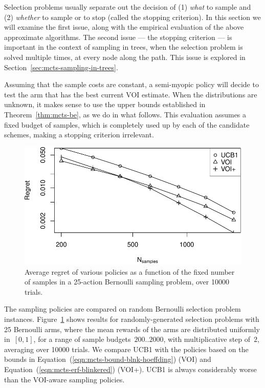 Selection problems usually separate out the decision of (1) {\em what}
to sample and (2) {\em whether} to sample or to stop (called the stopping criterion).
In this section we will examine the first issue, along with the empirical evaluation 
of the above approximate algorithms. The second issue --- the stopping
criterion --- is important in the context of sampling in trees, when the
selection problem is solved multiple times, at every node along the
path. This issue is explored in Section~\ref{sec:mcts-sampling-in-trees}.

Assuming that the sample costs are constant,
a semi-myopic policy will decide to test the arm that has the best
current VOI estimate. 
When the distributions are unknown, it makes sense
to use the upper bounds established in Theorem~\ref{thm:mcts-be}, as
we do in what follows. This evaluation assumes a fixed budget of samples, which is
completely used up by each of the candidate schemes, making a stopping
criterion irrelevant.

\begin{figure}[h!]
\centering
\includegraphics[scale=0.55]{mcts-flat.pdf}
\caption{Average regret of various policies as a function of the fixed number 
of samples in a 25-action Bernoulli sampling problem, over 10000 trials.}
\label{fig:random-instances}
\end{figure}

The sampling policies are compared on random Bernoulli
selection problem instances. Figure~\ref{fig:random-instances} shows results for
randomly-generated selection problems with 25 Bernoulli arms, where
the mean rewards of the arms are distributed uniformly in~$[0,1]$, 
for a range of sample budgets~$200..2000$, with multiplicative
step of~$2$, averaging over 10000 trials.  We compare UCB1 with the 
policies based on the bounds in
Equation~(\ref{eqn:mcts-bound-blnk-hoeffding}) (VOI) and
Equation~(\ref{eqn:mcts-erf-blinkered}) (VOI+).
UCB1 is always considerably worse than the VOI-aware sampling policies.

